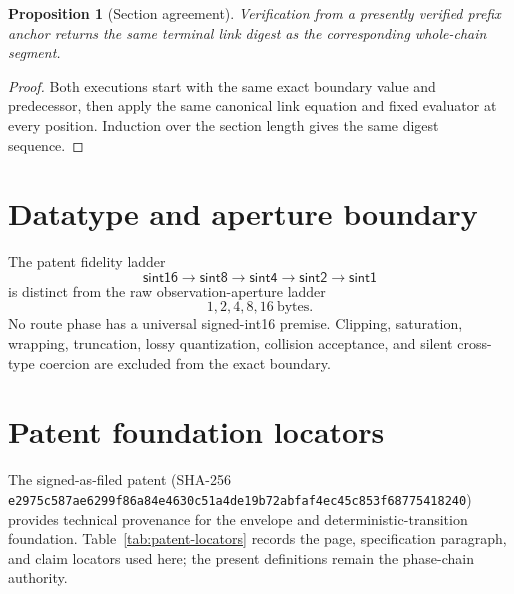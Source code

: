 \documentclass[11pt,letterpaper]{article}
\newtheorem{proposition}[theorem]{Proposition}
\theoremstyle{definition}
\begin{document}
\begin{proposition}[Section agreement]
Verification from a presently verified prefix anchor returns the same
terminal link digest as the corresponding whole-chain segment.
\end{proposition}
\begin{proof}
Both executions start with the same exact boundary value and predecessor, then
apply the same canonical link equation and fixed evaluator at every position.
Induction over the section length gives the same digest sequence.
\end{proof}

\section{Datatype and aperture boundary}

The patent fidelity ladder
\[
\mathsf{sint16}\to\mathsf{sint8}\to\mathsf{sint4}
\to\mathsf{sint2}\to\mathsf{sint1}
\]
is distinct from the raw observation-aperture ladder
\[
1,2,4,8,16\ \text{bytes}.
\]
No route phase has a universal signed-int16 premise.  Clipping, saturation,
wrapping, truncation, lossy quantization, collision acceptance, and silent
cross-type coercion are excluded from the exact boundary.

\section{Patent foundation locators}

The signed-as-filed patent (SHA-256
\nolinkurl{e2975c587ae6299f86a84e4630c51a4de19b72abfaf4ec45c853f68775418240})
provides technical provenance for the envelope and deterministic-transition
foundation.  Table~\ref{tab:patent-locators} records the page, specification
paragraph, and claim locators used here; the present definitions remain the
phase-chain authority.
\end{document}
